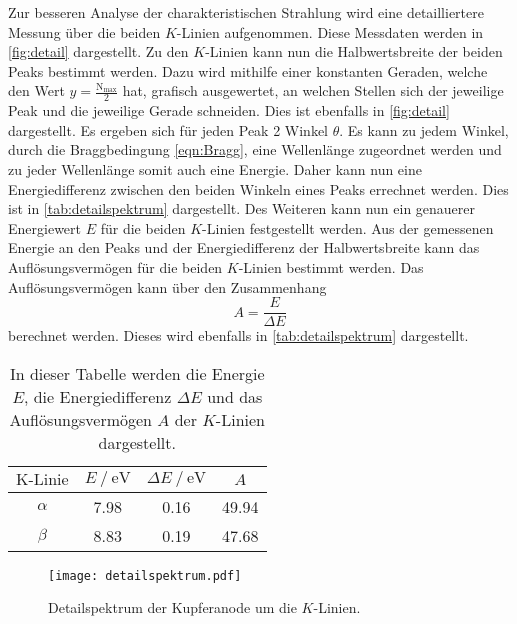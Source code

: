 Zur besseren Analyse der charakteristischen Strahlung wird eine detailliertere Messung über die beiden $K$-Linien aufgenommen. Diese Messdaten werden in \autoref{fig:detail}
dargestellt. Zu den $K$-Linien kann nun die Halbwertsbreite der beiden Peaks bestimmt werden. Dazu wird mithilfe einer konstanten Geraden, welche
den Wert $y = \frac{\text{N}_{\text{max}}}{2}$ hat, grafisch ausgewertet, an welchen Stellen sich der jeweilige Peak und die jeweilige Gerade schneiden. Dies ist 
ebenfalls in \autoref{fig:detail} dargestellt. Es ergeben sich für jeden Peak 2 Winkel $\theta$. Es kann zu jedem Winkel, durch die Braggbedingung \eqref{eqn:Bragg},
eine Wellenlänge zugeordnet werden und zu jeder Wellenlänge somit auch eine Energie. Daher kann nun eine Energiedifferenz zwischen den beiden Winkeln eines Peaks errechnet werden.
Dies ist in \autoref{tab:detailspektrum} dargestellt. Des Weiteren kann nun ein genauerer Energiewert $E$ für die beiden $K$-Linien festgestellt werden. 
Aus der gemessenen Energie an den Peaks und der Energiedifferenz der Halbwertsbreite kann das Auflösungsvermögen für die beiden $K$-Linien bestimmt werden.
Das Auflösungsvermögen kann über den Zusammenhang 
\begin{equation*}
    A = \frac{E}{\Delta E}
\end{equation*}
berechnet werden. Dieses wird ebenfalls in \autoref{tab:detailspektrum} dargestellt.
\begin{table}
    \centering
    \caption{In dieser Tabelle werden die Energie $E$, die Energiedifferenz $\Delta E$ und das Auflösungsvermögen $A$ der $K$-Linien dargestellt.}
    \label{tab:detailspektrum}
    \begin{tabular}{c S[table-format = 1.2] S[table-format = 1.2] S[table-format = 2.2]}
      \toprule
       {$\text{K-Linie}$} & {$E \mathbin{/} \unit{\electronvolt}$} & {$\Delta E \mathbin{/} \unit{\electronvolt}$} & {$A$}\\
      \midrule
        {$\alpha$} & 7.98 & 0.16 & 49.94 \\
        {$\beta$}  & 8.83 & 0.19 & 47.68 \\
      \bottomrule
    \end{tabular}
\end{table}

\begin{figure}  
    \centering
    \texttt{[image: detailspektrum.pdf]}
    \caption{Detailspektrum der Kupferanode um die $K$-Linien.}
    \label{fig:detail}
\end{figure}

